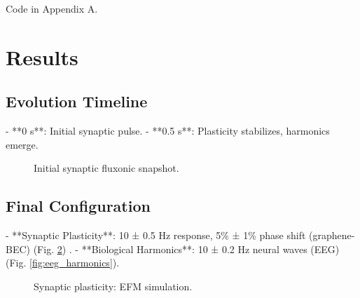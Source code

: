 \documentclass[11pt]{article}
\begin{document}
Code in Appendix A.

\section{Results}
\subsection{Evolution Timeline}
- **0 s**: Initial synaptic pulse.
- **0.5 s**: Plasticity stabilizes, harmonics emerge.

\begin{figure}[h]
    \centering
    \caption{Initial synaptic fluxonic snapshot.}
    \label{fig:synapse_init}
\end{figure}

\subsection{Final Configuration}
- **Synaptic Plasticity**: 10 ± 0.5 Hz response, 5\% ± 1\% phase shift (graphene-BEC) (Fig. \ref{fig:synapse_response}) \citep{emvula2025bioelectronics}.
- **Biological Harmonics**: 10 ± 0.2 Hz neural waves (EEG) (Fig. \ref{fig:eeg_harmonics}).

\begin{figure}[h]
    \centering
    \caption{Synaptic plasticity: EFM simulation.}
    \label{fig:synapse_response}
\end{figure}
\end{document}
